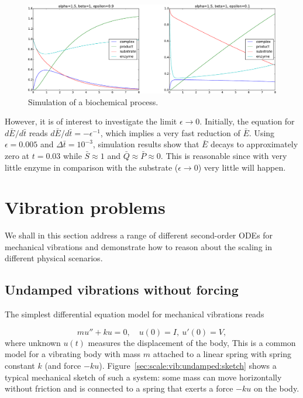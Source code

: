 \documentclass[graybox,envcountchap,sectrefs,final]{svmonodo}
\begin{document}
\begin{figure}[!ht]  %
  \centerline{\includegraphics[width=1.0\linewidth]{fig-scaling/biochem.pdf}}
  \caption{
  Simulation of a biochemical process. \label{scale:MMK:fig}
  }
\end{figure}


However, it is of interest to investigate the limit $\epsilon\rightarrow 0$.
Initially, the equation for $d\bar E/d\bar t$ reads
$d\bar E/d\bar t = -\epsilon^{-1}$, which implies a very fast reduction of
$\bar E$. Using $\epsilon=0.005$ and $\Delta\bar t = 10^{-3}$, simulation
results show that $\bar E$ decays to approximately zero at $t=0.03$ while
$\bar S\approx 1$ and $\bar Q \approx \bar P\approx 0$.
This is reasonable since with
very little enzyme in comparison with the substrate ($\epsilon\rightarrow 0$)
very little will happen.

\section{Vibration problems}
\label{sec:scale:vib}

We shall in this section
address a range of different second-order ODEs for mechanical
vibrations and demonstrate how to reason about the scaling in
different physical scenarios.


\subsection{Undamped vibrations without forcing}
\label{sec:scale:vib:undamped}

The simplest differential equation model for mechanical vibrations
reads

\begin{equation}
mu'' + ku = 0,\quad u(0)=I,\ u'(0)=V,
\label{sec:scale:vib:undamped:model}
\end{equation}
where unknown $u(t)$ measures the displacement of the body,
This is a common model for a vibrating body  with mass $m$ attached
to a linear spring with spring constant $k$ (and force $-ku$).
Figure~\ref{sec:scale:vib:undamped:sketch} shows a typical mechanical
sketch of such a system: some mass can move horizontally without friction
and is connected to a spring that exerts a force $-ku$ on the body.
\end{document}

